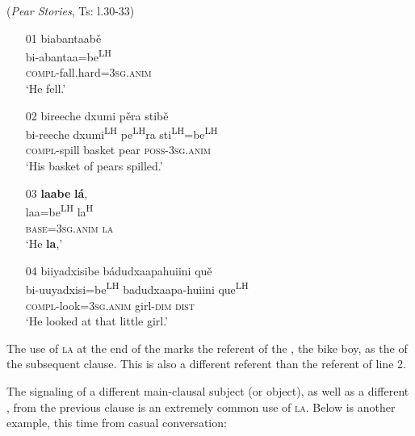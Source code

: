 \ea\label{markedIPR2}  (\textit{Pear Stories}, Ts: l.30-33)
\begin{itemize}
\item[01]
\glll biabantaab\v{e}  \\
bi-abantaa=be\textsuperscript{LH}  \\
\textsc{compl}-fall.hard=3\textsc{sg.anim}  \\
\glt `He fell.'


\item[02]
\glll bireeche dxumi p\v{e}ra stib\v{e}  \\
bi-reeche dxumi\textsuperscript{LH} pe\textsuperscript{LH}ra sti\textsuperscript{LH}=be\textsuperscript{LH}  \\
\textsc{compl}-spill basket pear \textsc{poss}-3\textsc{sg.anim}  \\
\glt `His basket of pears spilled.'


\item[03]
\glll \textbf{laabe} \textbf{l\'{a}},  \\
laa=be\textsuperscript{LH} la\textsuperscript{H}  \\
\textsc{base}=3\textsc{sg.anim} \textsc{la}  \\
\glt `He \textbf{la},'


\item[04]
\glll biiyadxisibe b\'{a}dudxaapahuiini qu\v{e}  \\
bi-uuyadxisi=be\textsuperscript{LH} badudxaapa-huiini que\textsuperscript{LH}  \\
\textsc{compl}-look=3\textsc{sg.anim} girl-\textsc{dim} \textsc{dist}  \\
\glt `He looked at that little girl.' 

\end{itemize}
\z
The use of \textsc{la} at the end of the  marks the referent of the , the bike boy, as the  of the subsequent clause. This is also a different  referent than the  referent of line 2.

The signaling of a different main-clausal subject (or object), as well as a different , from the previous clause is an extremely common use of \textsc{la}.  Below is another example, this time from casual conversation:

